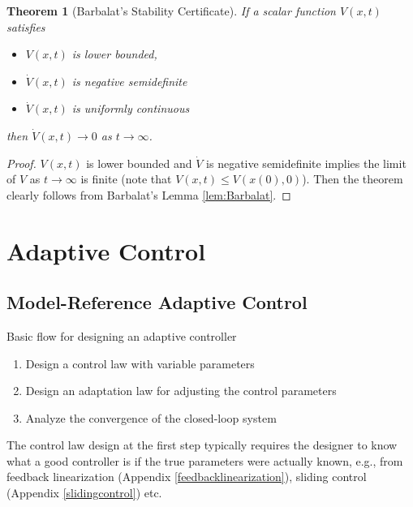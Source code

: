 \documentclass[
]{book}
\newtheorem{theorem}{Theorem}[chapter]
\theoremstyle{definition}
\theoremstyle{definition}
\theoremstyle{definition}
\theoremstyle{definition}
\theoremstyle{remark}
\begin{document}
\begin{theorem}[Barbalat's Stability Certificate]
\protect\hypertarget{thm:BarbalatStability}{}\label{thm:BarbalatStability}If a scalar function \(V(x,t)\) satisfies

\begin{itemize}
\item
  \(V(x,t)\) is lower bounded,
\item
  \(\dot{V}(x,t)\) is negative semidefinite
\item
  \(\dot{V}(x,t)\) is uniformly continuous
\end{itemize}

then \(\dot{V}(x,t) \rightarrow 0\) as \(t \rightarrow \infty\).
\end{theorem}

\begin{proof}
\(V(x,t)\) is lower bounded and \(\dot{V}\) is negative semidefinite implies the limit of \(V\) as \(t \rightarrow \infty\) is finite (note that \(V(x,t) \leq V(x(0),0)\)). Then the theorem clearly follows from Barbalat's Lemma \ref{lem:Barbalat}.
\end{proof}

\hypertarget{adaptivecontrol}{%
\chapter{Adaptive Control}\label{adaptivecontrol}}

\hypertarget{model-reference-adaptive-control}{%
\section{Model-Reference Adaptive Control}\label{model-reference-adaptive-control}}

Basic flow for designing an adaptive controller

\begin{enumerate}
\def\labelenumi{\arabic{enumi}.}
\item
  Design a control law with variable parameters
\item
  Design an adaptation law for adjusting the control parameters
\item
  Analyze the convergence of the closed-loop system
\end{enumerate}

The control law design at the first step typically requires the designer to know what a good controller is if the true parameters were actually known, e.g., from feedback linearization (Appendix \ref{feedbacklinearization}), sliding control (Appendix \ref{slidingcontrol}) etc.
\end{document}
